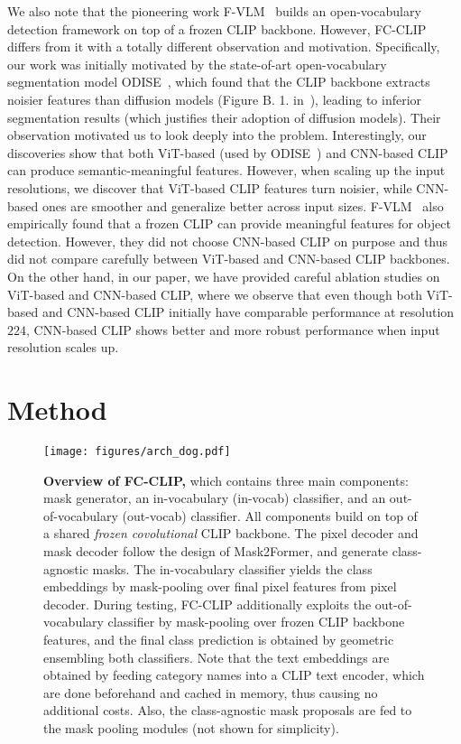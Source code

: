 \documentclass{article}
\newcommand{\modelname}{FC-CLIP\xspace}
\begin{document}
We also note that the pioneering work F-VLM~\cite{kuo2022f} builds an open-vocabulary detection framework on top of a frozen CLIP backbone. However, \modelname differs from it with a totally different observation and motivation. Specifically, our work was initially motivated by the state-of-art open-vocabulary segmentation model ODISE~\cite{xu2023open}, which found that the CLIP backbone extracts noisier features than diffusion models (Figure B. 1. in~\cite{xu2023open}), leading to inferior segmentation results (which justifies their adoption of diffusion models). Their observation motivated us to look deeply into the problem. Interestingly, our discoveries show that both ViT-based (used by ODISE~\cite{xu2023open}) and CNN-based CLIP can produce semantic-meaningful features. However, when scaling up the input resolutions, we discover that ViT-based CLIP features turn noisier, while CNN-based ones are smoother and generalize better across input sizes. F-VLM~\cite{kuo2022f} also empirically found that a frozen CLIP can provide meaningful features for object detection. However, they did not choose CNN-based CLIP on purpose and thus did not compare carefully between ViT-based and CNN-based CLIP backbones. On the other hand, in our paper, we have provided careful ablation studies on ViT-based and CNN-based CLIP, where we observe that even though both ViT-based and CNN-based CLIP initially have comparable performance at resolution $224$, CNN-based CLIP shows better and more robust performance when input resolution scales up. \section{Method}
\label{Method}

\begin{figure}
    \centering
    \texttt{[image: figures/arch\_dog.pdf]}
    \caption{
    \textbf{Overview of \modelname,} which contains three main components: mask generator, an in-vocabulary (in-vocab) classifier, and an out-of-vocabulary (out-vocab) classifier.
    All components build on top of a shared \textit{frozen covolutional} CLIP backbone.
    The pixel decoder and mask decoder follow the design of Mask2Former, and generate class-agnostic masks.
    The in-vocabulary classifier yields the class embeddings by mask-pooling over final pixel features from pixel decoder.
    During testing, \modelname additionally exploits the out-of-vocabulary classifier by mask-pooling over frozen CLIP backbone features, and the final class prediction is obtained by geometric ensembling both classifiers.    
    Note that the text embeddings are obtained by feeding category names into a CLIP text encoder, which are done beforehand and cached in memory, thus causing no additional costs.
    Also, the class-agnostic mask proposals are fed to the mask pooling modules (not shown for simplicity).
    }
\label{fig:model_arch}
\end{figure}
\end{document}
